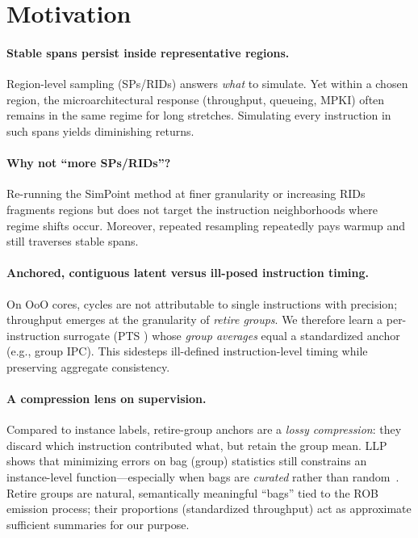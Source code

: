 \documentclass[conference]{IEEEtran}
\newcommand{\pts}{\textsc{PTS} }
\begin{document}
\section{Motivation}
\label{sec:motivation}

\paragraph{Stable spans persist inside representative regions.}
Region-level sampling (SPs/RIDs) answers \emph{what} to simulate. Yet within a chosen region, the microarchitectural response (throughput, queueing, MPKI) often remains in the same regime for long stretches. Simulating every instruction in such spans yields diminishing returns.

\paragraph{Why not “more SPs/RIDs”?}
Re-running the SimPoint method at finer granularity or increasing RIDs fragments regions but does not target the instruction neighborhoods where regime shifts occur. Moreover, repeated resampling repeatedly pays warmup and still traverses stable spans.

\paragraph{Anchored, contiguous latent versus ill-posed instruction timing.}
On OoO cores, cycles are not attributable to single instructions with precision; throughput emerges at the granularity of \emph{retire groups}. We therefore learn a per-instruction surrogate (\pts) whose \emph{group averages} equal a standardized anchor (e.g., group IPC). This sidesteps ill-defined instruction-level timing while preserving aggregate consistency.

\paragraph{A compression lens on supervision.}
Compared to instance labels, retire-group anchors are a \emph{lossy compression}: they discard which instruction contributed what, but retain the group mean. LLP shows that minimizing errors on bag (group) statistics still constrains an instance-level function—especially when bags are \emph{curated} rather than random~\cite{yu2014-llp,scott2020-llp,law2018-agg,zhang2020-agg}. Retire groups are natural, semantically meaningful “bags” tied to the ROB emission process; their proportions (standardized throughput) act as approximate sufficient summaries for our purpose.
\end{document}
